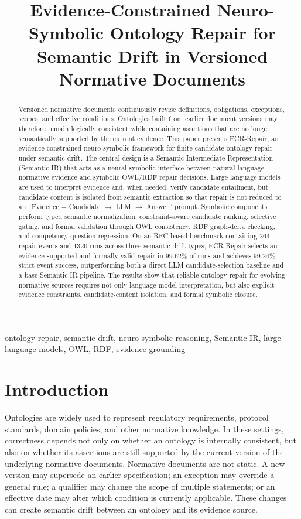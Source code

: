 \documentclass[conference]{IEEEtran}
\title{Evidence-Constrained Neuro-Symbolic Ontology Repair for Semantic Drift in Versioned Normative Documents}
\author{\IEEEauthorblockN{Anonymous Authors}
\IEEEauthorblockA{Anonymous Affiliation\\
Email: anonymous@example.com}}
\begin{document}
\maketitle

\begin{abstract}
Versioned normative documents continuously revise definitions, obligations, exceptions, scopes, and effective conditions. Ontologies built from earlier document versions may therefore remain logically consistent while containing assertions that are no longer semantically supported by the current evidence. This paper presents ECR-Repair, an evidence-constrained neuro-symbolic framework for finite-candidate ontology repair under semantic drift. The central design is a Semantic Intermediate Representation (Semantic IR) that acts as a neural-symbolic interface between natural-language normative evidence and symbolic OWL/RDF repair decisions. Large language models are used to interpret evidence and, when needed, verify candidate entailment, but candidate content is isolated from semantic extraction so that repair is not reduced to an ``Evidence + Candidate $\rightarrow$ LLM $\rightarrow$ Answer'' prompt. Symbolic components perform typed semantic normalization, constraint-aware candidate ranking, selective gating, and formal validation through OWL consistency, RDF graph-delta checking, and competency-question regression. On an RFC-based benchmark containing 264 repair events and 1320 runs across three semantic drift types, ECR-Repair selects an evidence-supported and formally valid repair in 99.62\% of runs and achieves 99.24\% strict event success, outperforming both a direct LLM candidate-selection baseline and a base Semantic IR pipeline. The results show that reliable ontology repair for evolving normative sources requires not only language-model interpretation, but also explicit evidence constraints, candidate-content isolation, and formal symbolic closure.
\end{abstract}

\begin{IEEEkeywords}
ontology repair, semantic drift, neuro-symbolic reasoning, Semantic IR, large language models, OWL, RDF, evidence grounding
\end{IEEEkeywords}

\section{Introduction}

Ontologies are widely used to represent regulatory requirements, protocol standards, domain policies, and other normative knowledge. In these settings, correctness depends not only on whether an ontology is internally consistent, but also on whether its assertions are still supported by the current version of the underlying normative documents. Normative documents are not static. A new version may supersede an earlier specification; an exception may override a general rule; a qualifier may change the scope of multiple statements; or an effective date may alter which condition is currently applicable. These changes can create semantic drift between an ontology and its evidence source.
\end{document}
